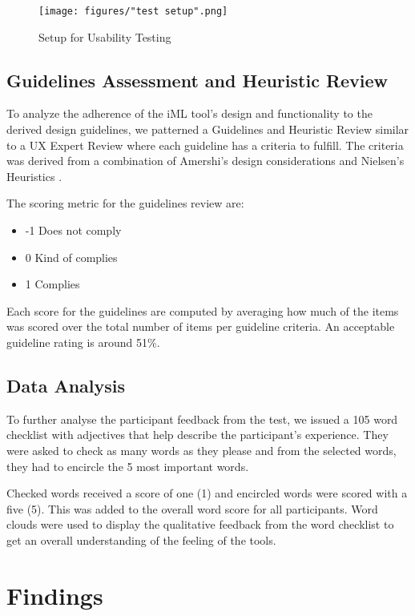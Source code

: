 \documentclass{sigchi}
\begin{document}
\begin{figure}[h]
    \centering
    \texttt{[image: figures/"test setup".png]}
    \caption{Setup for Usability Testing}
    \label{fig:utsetup}
\end{figure}

\subsection{Guidelines Assessment and Heuristic Review}
To analyze the adherence of the iML tool's design and functionality to the derived design guidelines, we patterned a Guidelines and Heuristic Review similar to a UX Expert Review where each guideline has a criteria to fulfill. The criteria was derived from a combination of Amershi's design considerations  and Nielsen's Heuristics .  

The scoring metric for the guidelines review are: 
\begin{itemize}
    \item -1 Does not comply
    \item 0 Kind of complies
    \item 1 Complies
\end{itemize}

Each score for the guidelines are computed by averaging how much of the items was scored over the total number of items per guideline criteria. An acceptable guideline rating is around 51\%.

\subsection{Data Analysis}
To further analyse the participant feedback from the test, we issued a 105 word checklist with adjectives that help describe the participant's experience. They were asked to check as many words as they please and from the selected words, they had to encircle the 5 most important words. 

Checked words received a score of one (1) and encircled words were scored with a five (5). This was added to the overall word score for all participants. Word clouds were used to display the qualitative feedback from the word checklist to get an overall understanding of the feeling of the tools. 

\section{Findings}
\end{document}
